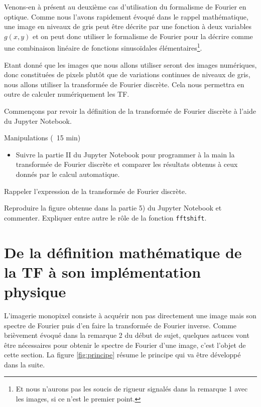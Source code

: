 \documentclass[a4paper,twoside,10pt]{book}
\begin{document}
Venons-en à présent au deuxième cas d'utilisation du formalisme de Fourier en optique.
Comme nous l'avons rapidement évoqué dans le rappel mathématique, une image en niveaux de gris  peut être décrite par une fonction à deux variables $g(x, y)$ et on peut donc utiliser le formalisme de Fourier pour la décrire comme une combinaison linéaire de fonctions sinusoïdales élémentaires\footnote{Et nous n'aurons pas les soucis de rigueur signalés dans la remarque 1 avec les images, si ce n'est le premier point.}.

Etant donné que les images que nous allons utiliser seront des images numériques, donc constituées de pixels plutôt que de variations continues de niveaux de gris, nous allons utiliser la transformée de Fourier discrète. Cela nous permettra en outre de calculer numériquement les TF.

Commençons par revoir la définition de la transformée de Fourier discrète à l'aide du Jupyter Notebook.

\begin{bclogo}[noborder=true, logo = \bcoutil,barre = line]{Manipulations (\faClockO\ 15 min)}
\begin{itemize}[label=]
\item Suivre la partie II du Jupyter Notebook pour programmer \og à la main \fg{} la transformée de Fourier discrète et comparer les résultats obtenus à ceux donnés par le calcul automatique.
\end{itemize}
\end{bclogo}

\begin{question}[resume]
\item Rappeler l'expression de la transformée de Fourier discrète.
\item Reproduire la figure obtenue dans la partie 5) du Jupyter Notebook et commenter. Expliquer entre autre le rôle de la fonction \texttt{fftshift}.
\end{question}



%
%
\section{De la définition mathématique de la TF à son implémentation physique}

L'imagerie monopixel consiste à acquérir non pas directement une image mais son spectre de Fourier puis d'en faire la transformée de Fourier inverse. Comme brièvement évoqué dans la remarque 2 du début de sujet, quelques astuces vont être nécessaires pour obtenir le spectre de Fourier d'une image, c'est l'objet de cette section. La figure \ref{fig:principe} résume le principe qui va être développé dans la suite.
\end{document}
